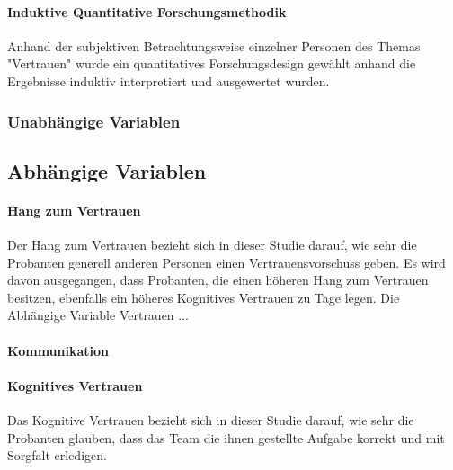 \documentclass[a4paper,11pt]{article}%
\renewcommand{\\}{\vspace*{0.5\baselineskip} \newline}
\begin{document}
			\paragraph{Induktive Quantitative Forschungsmethodik}
				Anhand der subjektiven Betrachtungsweise einzelner Personen des Themas "Vertrauen" wurde ein quantitatives Forschungsdesign gewählt anhand die Ergebnisse induktiv interpretiert und ausgewertet wurden.
				
			\subsubsection{Unabhängige Variablen}

	\subsection{Abhängige Variablen}
		\paragraph{Hang zum  Vertrauen}
Der Hang zum Vertrauen bezieht sich in dieser Studie darauf, wie sehr die Probanten generell anderen Personen einen Vertrauensvorschuss geben.
Es wird davon ausgegangen, dass Probanten, die einen höheren Hang zum Vertrauen besitzen, ebenfalls ein höheres Kognitives Vertrauen zu Tage legen. 
			Die Abhängige Variable Vertrauen ...	
\paragraph{Kommunikation}
\paragraph{Kognitives Vertrauen}
Das Kognitive Vertrauen bezieht sich in dieser Studie darauf, wie sehr die Probanten glauben, dass das Team die ihnen gestellte Aufgabe korrekt und mit Sorgfalt erledigen.
\end{document}
